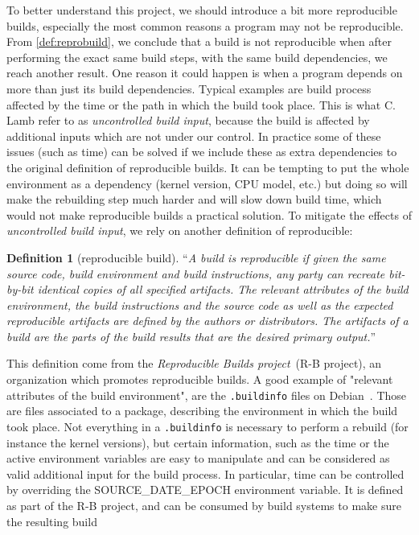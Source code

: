 \documentclass[a4paper,11pt,oneside]{report}
\theoremstyle{definition}
\newtheorem{definition}{Definition}[section]
\newcommand{\rb}{reproducible builds\xspace}
\newcommand{\sde}{SOURCE\_DATE\_EPOCH\xspace}
\begin{document}
To better understand this project, we should introduce a bit more \rb,
especially the most common reasons a program may not be reproducible. From
\autoref{def:reprobuild}, we conclude that a build is not reproducible when
after performing the exact same build steps, with the same build dependencies,
we reach another result. One reason it could happen is when a program depends
on more than just its build dependencies. Typical examples are build process
affected by the time or the path in which the build took place. This is what C.
Lamb refer to as \emph{uncontrolled build input}, because the build is affected
by additional inputs which are not under our control. In practice some of these
issues (such as time) can be solved if we include these as extra dependencies
to the original definition of \rb. It can be tempting to put the whole
environment as a dependency (kernel version, CPU model, etc.) but doing so will
make the rebuilding step much harder and will slow down build time, which would
not make \rb a practical solution. To mitigate the effects of
\emph{uncontrolled build input}, we rely on another definition of reproducible:
\begin{definition}[reproducible build]
\label{def:reprobuild2}
``\emph{A build is reproducible if given the same source code, build
    environment and build instructions, any party can recreate bit-by-bit
    identical copies of all specified artifacts.
The relevant attributes of the build environment, the build instructions and
    the source code as well as the expected reproducible artifacts are defined
    by the authors or distributors. The artifacts of a build are the parts of
    the build results that are the desired primary output.}''~\cite{reprobuilds:def}
\end{definition}
This definition come from the \emph{Reproducible Builds project}~(R-B project),
an organization which promotes \rb. A good example of "relevant attributes of
the build environment", are the \verb|.buildinfo| files on
Debian~\cite{debian:buildinfo}. Those are files associated to a package,
describing the environment in which the build took place. Not everything in a
\verb|.buildinfo| is necessary to perform a rebuild (for instance the kernel
versions), but certain information, such as the time or the active environment
variables are easy to manipulate and can be considered as valid additional
input for the build process. In particular, time can be controlled by
overriding the \sde environment variable. It is defined as part of the R-B
project, and can be consumed by build systems to make sure the resulting build
\end{document}
